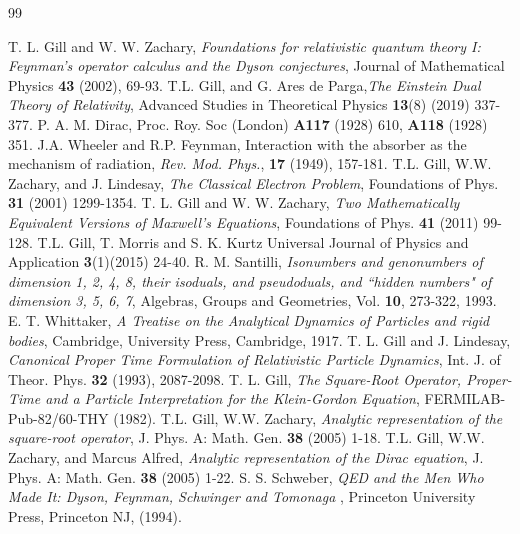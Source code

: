 \documentclass[11pt, reqno]{amsart}
\numberwithin{equation}{section}
\begin{document}
\begin{thebibliography}{99}
\small


 T. L. Gill and W. W. Zachary, {\it Foundations for relativistic quantum theory I: Feynman's operator calculus and the Dyson conjectures}, Journal of  Mathematical Physics  {\bf 43} (2002), 69-93.
 T.L. Gill, and G. Ares de Parga,{\it The Einstein Dual Theory of Relativity},  Advanced Studies in Theoretical Physics {\bf 13}(8) (2019) 337-377.
 P. A. M. Dirac, Proc. Roy. Soc (London) {\bf{A117}} (1928) 610, {\bf{A118}} (1928) 351.
 J.A. Wheeler and R.P. Feynman, Interaction with the absorber as the mechanism of radiation, {\it{ Rev. Mod. Phys.}}, {\bf{17}} (1949), 157-181.
 T.L. Gill, W.W. Zachary, and J. Lindesay,  {\it The Classical Electron Problem},   Foundations of Phys. {\bf{31}} (2001) 1299-1354.
 T. L. Gill and W. W. Zachary, {\it Two Mathematically Equivalent Versions of Maxwell's Equations},   Foundations of Phys. {\bf{41}} (2011) 99-128. 
T.L. Gill, T. Morris and S. K. Kurtz  Universal Journal of Physics and Application {\bf 3}(1)(2015) 24-40.
 R. M. Santilli, {\it Isonumbers and genonumbers of dimension 1, 2, 4, 8, their isoduals, and pseudoduals, and ``hidden numbers" of dimension 3, 5, 6, 7}, Algebras, Groups and Geometries, Vol. {\bf 10}, 273-322, 1993.
E. T. Whittaker,  {\it A Treatise on the Analytical Dynamics of Particles and rigid bodies}, Cambridge, University Press, Cambridge, 1917.
 T. L. Gill and J. Lindesay, {\it Canonical Proper Time Formulation of Relativistic Particle Dynamics}, Int. J. of Theor. Phys.  {\bf 32} (1993), 2087-2098.
 T. L. Gill, {\it The Square-Root Operator,  Proper-Time and a Particle Interpretation for the Klein-Gordon Equation}, FERMILAB-Pub-82/60-THY (1982).
 T.L. Gill, W.W. Zachary,  {\it Analytic representation of the square-root operator},   J. Phys. A: Math. Gen. {\bf 38} (2005) 1-18.
 T.L. Gill, W.W. Zachary, and Marcus Alfred,  {\it Analytic representation of the Dirac equation},   J. Phys. A: Math. Gen. {\bf 38} (2005) 1-22.
 S. S. Schweber, {\it QED and the Men Who Made It: Dyson, Feynman, Schwinger and Tomonaga }, Princeton University Press, Princeton NJ, (1994).
\end{thebibliography}
\end{document}
